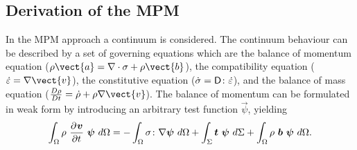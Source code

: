\subsection{Derivation of the MPM}
\label{sec:derivation-mpm}
In the MPM approach a continuum is considered. The continuum behaviour
can be described by a set of governing equations which are the balance
of momentum equation ($\rho \vect{a} = \Div{\tens{\sigma}} + \rho
\vect{b}$), the compatibility equation ($\dot{\tens{\varepsilon}} =
\Grad{\vect{v}}$), the constitutive equation ($\dot{\mathsf{\sigma}} =
\mathsf{D} \colon \dot{\mathsf{\varepsilon}}$), and the balance of mass equation
($\frac{D \rho}{D t} = \dot{\rho} + \rho \Grad{\vect{v}}$). The balance of momentum can be
formulated in weak form by introducing an arbitrary test function $\vec{\psi}$, yielding
\begin{equation}
  \label{eq:BalanceMomentum_wf}
  \Integral{3}{\rho\ \Deriv{\vec{v}}{t}\ \vec{\psi}} = -
  \Integral{3}{\tens{\sigma} \colon \Grad{\vec{\psi}}} +
  \Integral{2}{\vec{t}\ \vec{\psi}} + \Integral{3}{
  \rho\ \vec{b}\ \vec{\psi}}.
\end{equation}\\

